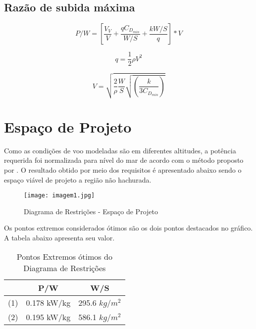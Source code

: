 \subsection{Razão de subida máxima}

\begin{equation}
P/W = \left[ \frac{V_V}{V} + \frac{q C_{D_{min}}}{W/S} +  \frac{k W/S}{q} \right] * V  
\end{equation}

\begin{equation}
q = \frac{1}{2} \rho V^2
\end{equation}

\begin{equation}
V = \sqrt{ \frac{2}{\rho} \frac{W}{S} \sqrt{ \left( \frac{k}{3 C_{D_{min}}}\right)} }
\end{equation}

\section{Espaço de Projeto}

Como as condições de voo modeladas são em diferentes altitudes, a potência requerida foi normalizada para nível do mar de acordo com o método proposto por \cite{anderson1999aircraft}.
O resultado obtido por meio dos requisitos é apresentado abaixo sendo o espaço viável de projeto a região não hachurada.

\begin{figure}[H]
\centering
\texttt{[image: imagem1.jpg]}
\caption[Diagrama de Restrições]{Diagrama de Restrições - Espaço de Projeto}
\label{fig:diagr_restri}
\end{figure}

Os pontos extremos considerados ótimos são os dois pontos destacados no gráfico.
A tabela abaixo apresenta seu valor.

\begin{table}[H]
\centering
\begin{tabular}{ccc}
\toprule
 & P/W & W/S \\ \midrule
(1) & 0.178 kW/kg & 295.6 $kg/m^2$ \\
(2) & 0.195 kW/kg & 586.1 $kg/m^2$ \\
\bottomrule
\end{tabular}
\caption[Pontos Extremos ótimos do Diagrama de Restrições]{Pontos Extremos ótimos do Diagrama de Restrições}
\label{tbl:pontos_extremos}
\end{table}

